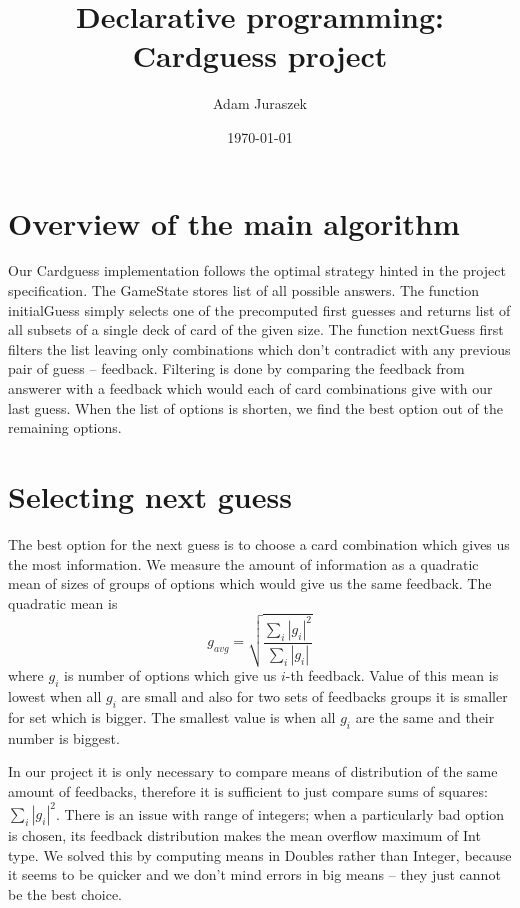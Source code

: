 \documentclass{article}
\begin{document}
\title{Declarative programming: Cardguess project}
\author{Adam Juraszek}
\date{\today}
\maketitle

\section{Overview of the main algorithm}

Our Cardguess implementation follows the optimal strategy hinted in the project specification.
The Game\-State stores list of all possible answers.
The function initialGuess simply selects one of the precomputed first guesses and returns list of all subsets of a single deck of card of the given size.
The function nextGuess first filters the list leaving only combinations which don't contradict with any previous pair of guess -- feedback.
Filtering is done by comparing the feedback from answerer with a feedback which would each of card combinations give with our last guess.
When the list of options is shorten, we find the best option out of the remaining options.

\section{Selecting next guess}

The best option for the next guess is to choose a card combination which gives us the most information.
We measure the amount of information as a quadratic mean of sizes of groups of options which would give us the same feedback.
The quadratic mean is $$ g_{avg} = \sqrt{\frac{\sum_i |g_i|^2}{\sum_i |g_i|}}$$ where $g_i$ is number of options which give us $i$-th feedback.
Value of this mean is lowest when all $g_i$ are small and also for two sets of feedbacks groups it is smaller for set which is bigger.
The smallest value is when all $g_i$ are the same and their number is biggest.

In our project it is only necessary to compare means of distribution of the same amount of feedbacks, therefore it is sufficient to just compare sums of squares: $\sum_i |g_i|^2$.
There is an issue with range of integers; when a particularly bad option is chosen, its feedback distribution makes the mean overflow maximum of Int type.
We solved this by computing means in Doubles rather than Integer, because it seems to be quicker and we don't mind errors in big means -- they just cannot be the best choice.
\end{document}
